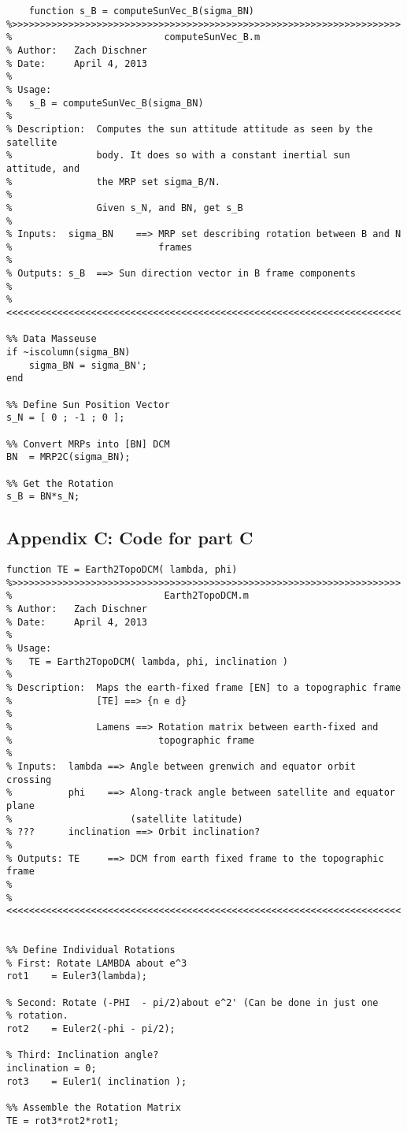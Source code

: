 \documentclass[]{aiaa-tc}%
\begin{document}
\label{APP:Code for Part B}
\begin{lstlisting}
	function s_B = computeSunVec_B(sigma_BN)
%>>>>>>>>>>>>>>>>>>>>>>>>>>>>>>>>>>>>>>>>>>>>>>>>>>>>>>>>>>>>>>>>>>>>> 
%                           computeSunVec_B.m
% Author:   Zach Dischner
% Date:     April 4, 2013
% 
% Usage:
%   s_B = computeSunVec_B(sigma_BN)
%
% Description:  Computes the sun attitude attitude as seen by the satellite 
%               body. It does so with a constant inertial sun attitude, and
%               the MRP set sigma_B/N.
% 
%               Given s_N, and BN, get s_B
% 
% Inputs:  sigma_BN    ==> MRP set describing rotation between B and N
%                          frames
%
% Outputs: s_B  ==> Sun direction vector in B frame components
% 
%<<<<<<<<<<<<<<<<<<<<<<<<<<<<<<<<<<<<<<<<<<<<<<<<<<<<<<<<<<<<<<<<<<<<<<

%% Data Masseuse 
if ~iscolumn(sigma_BN)
    sigma_BN = sigma_BN';
end

%% Define Sun Position Vector
s_N = [ 0 ; -1 ; 0 ];

%% Convert MRPs into [BN] DCM
BN  = MRP2C(sigma_BN);

%% Get the Rotation
s_B = BN*s_N;
\end{lstlisting}


\subsection{Appendix C: Code for part C}

\label{APP:Code for Part C}
\begin{lstlisting}
function TE = Earth2TopoDCM( lambda, phi)
%>>>>>>>>>>>>>>>>>>>>>>>>>>>>>>>>>>>>>>>>>>>>>>>>>>>>>>>>>>>>>>>>>>>>> 
%                           Earth2TopoDCM.m
% Author:   Zach Dischner
% Date:     April 4, 2013
% 
% Usage:
%   TE = Earth2TopoDCM( lambda, phi, inclination )
%
% Description:  Maps the earth-fixed frame [EN] to a topographic frame 
%               [TE] ==> {n e d}
% 
%               Lamens ==> Rotation matrix between earth-fixed and
%                          topographic frame
% 
% Inputs:  lambda ==> Angle between grenwich and equator orbit crossing
%          phi    ==> Along-track angle between satellite and equator plane
%                     (satellite latitude)
% ???      inclination ==> Orbit inclination?
%
% Outputs: TE     ==> DCM from earth fixed frame to the topographic frame
% 
%<<<<<<<<<<<<<<<<<<<<<<<<<<<<<<<<<<<<<<<<<<<<<<<<<<<<<<<<<<<<<<<<<<<<<<


%% Define Individual Rotations
% First: Rotate LAMBDA about e^3
rot1    = Euler3(lambda);

% Second: Rotate (-PHI  - pi/2)about e^2' (Can be done in just one
% rotation.
rot2    = Euler2(-phi - pi/2);

% Third: Inclination angle? 
inclination = 0;
rot3    = Euler1( inclination );

%% Assemble the Rotation Matrix
TE = rot3*rot2*rot1;
\end{lstlisting}
\end{document}
